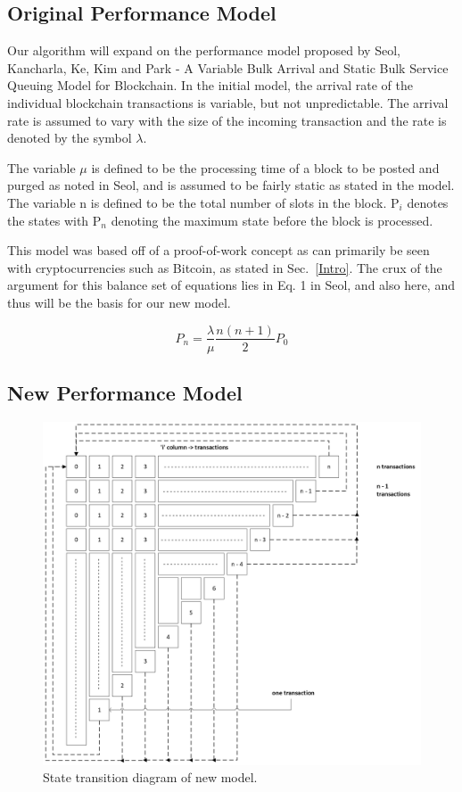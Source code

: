 \documentclass[conference]{IEEEtran}
\begin{document}
\subsection{Original Performance Model}\label{Model}
Our algorithm will expand on the performance model proposed by Seol, Kancharla, Ke, Kim and Park
 - A Variable Bulk Arrival and Static Bulk Service Queuing Model for Blockchain\cite{2020_ACM_Seol}. 
 In the initial model, the arrival rate of the individual blockchain transactions is variable, but not unpredictable. 
 The arrival rate is assumed to vary with the size of the incoming transaction and the rate is 
 denoted by the symbol $\lambda$.

The variable $\mu$ is defined to be the processing time of a block to be posted and purged as noted 
in Seol\cite{2020_ACM_Seol}, and is assumed to be fairly static as stated in the model. 
The variable n is defined to be the total number of slots in the block. P$_i$ denotes the states with 
P$_n$ denoting the maximum state before the block is processed. 

This model was based off of a proof-of-work concept as can primarily be seen with cryptocurrencies 
such as Bitcoin, as stated in Sec.~\ref{Intro}. The crux of the argument for this balance set of equations 
lies in Eq. 1 in Seol\cite{2020_ACM_Seol}, and also here, and thus will be the basis for our 
new model. 

\begin{equation}
P_n = \frac{\lambda}{\mu}\frac{n(n+1)}{2}P_0\label{om_1}
\end{equation}

\subsection{New Performance Model}\label{new_model}

\begin{figure}[htbp]
    \centerline{\includegraphics[width=\textwidth]{Figures/FlowDiagram.png}}
    \caption{State transition diagram of new model.} 
    \label{flow}
\end{figure}	
\end{document}
